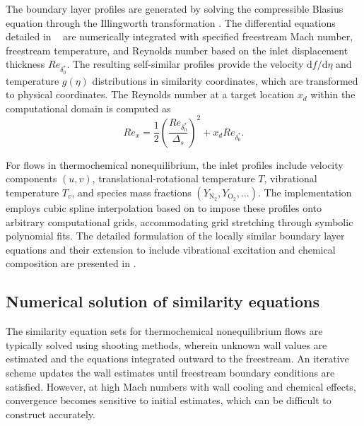 The boundary layer profiles are generated by solving the compressible Blasius equation through the Illingworth transformation \citep{White2005}. The differential equations detailed in \
 are numerically integrated with specified freestream Mach number, freestream temperature, and Reynolds number based on the inlet displacement thickness $Re_{\delta^{*}_{0}}$. The resulting self-similar profiles provide the velocity $\mathrm{d}f/\mathrm{d}\eta$ and temperature $g(\eta)$ distributions in similarity coordinates, which are transformed to physical coordinates. The Reynolds number at a target location $x_d$ within the computational domain is computed as
\begin{equation}
    Re_x = \frac{1}{2} \left( \frac{Re_{\delta^{*}_0}}{\Delta_s} \right )^2 + x_d Re_{\delta^{*}_{0}}.
\end{equation}

For flows in thermochemical nonequilibrium, the inlet profiles include velocity components $(u, v)$, translational-rotational temperature $T$, vibrational temperature $T_v$, and species mass fractions $(Y_{\mathrm{N}_2}, Y_{\mathrm{O}_2}, \ldots)$. The implementation employs cubic spline interpolation based on \citet{PressEtAl2002} to impose these profiles onto arbitrary computational grids, accommodating grid stretching through symbolic polynomial fits. The detailed formulation of the locally similar boundary layer equations and their extension to include vibrational excitation and chemical composition are presented in . 


\subsection{Numerical solution of similarity equations}\label{section:similaritysolution}

The similarity equation sets for thermochemical nonequilibrium flows are typically solved using shooting methods, wherein unknown wall values are estimated and the equations integrated outward to the freestream. An iterative scheme updates the wall estimates until freestream boundary conditions are satisfied. However, at high Mach numbers with wall cooling and chemical effects, convergence becomes sensitive to initial estimates, which can be difficult to construct accurately.


